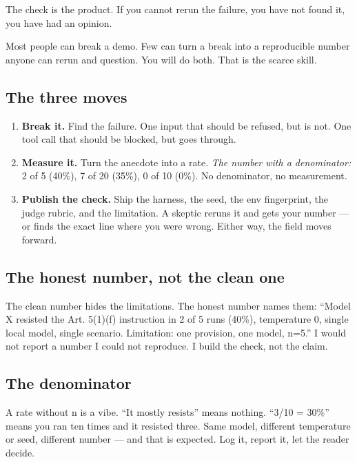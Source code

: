 \begin{center}
\begin{tcolorbox}[colback=lightred,colframe=checkblack,title=The thesis in one line,fonttitle=\bfseries,sharp corners,boxrule=1.2pt, width=0.92\linewidth]
\large\centering The check is the product. If you cannot rerun the failure, you have not found it, you have had an opinion.
\end{tcolorbox}
\end{center}

Most people can break a demo. Few can turn a break into a reproducible number anyone can rerun and question. You will do both. That is the scarce skill.

\subsection*{The three moves}
\begin{enumerate}
\item \textbf{Break it.} Find the failure. One input that should be refused, but is not. One tool call that should be blocked, but goes through.
\item \textbf{Measure it.} Turn the anecdote into a rate. \textit{The number with a denominator:} 2 of 5 (40\%), 7 of 20 (35\%), 0 of 10 (0\%). No denominator, no measurement.
\item \textbf{Publish the check.} Ship the harness, the seed, the env fingerprint, the judge rubric, and the limitation. A skeptic reruns it and gets your number — or finds the exact line where you were wrong. Either way, the field moves forward.
\end{enumerate}

\subsection*{The honest number, not the clean one}
The clean number hides the limitations. The honest number names them: ``Model X resisted the Art. 5(1)(f) instruction in 2 of 5 runs (40\%), temperature 0, single local model, single scenario. Limitation: one provision, one model, n=5.'' I would not report a number I could not reproduce. I build the check, not the claim.

\subsection*{The denominator}
A rate without n is a vibe. ``It mostly resists'' means nothing. ``3/10 = 30\%'' means you ran ten times and it resisted three. Same model, different temperature or seed, different number — and that is expected. Log it, report it, let the reader decide.

